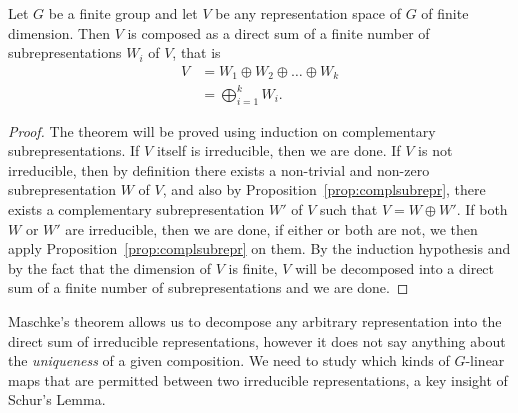 \begin{theorem}\label{thm:maschkes}
	Let $G$ be a finite group and let $V$ be any representation space of $G$ of finite dimension. Then $V$ is composed as a direct sum of a finite number of subrepresentations $W_i$ of $V$, that is
	\begin{align*}
		V &= W_1 \oplus W_2 \oplus \dots \oplus W_k \\
		&= \bigoplus_{i=1}^k W_i.
	\end{align*}
\end{theorem}
\begin{proof}
	The theorem will be proved using induction on complementary subrepresentations. If $V$ itself is irreducible, then we are done. If $V$ is not irreducible, then by definition there exists a non-trivial and non-zero subrepresentation $W$ of $V$, and also by Proposition~\ref{prop:complsubrepr}, there exists a complementary subrepresentation $W'$ of $V$ such that $V = W \oplus W'$. If both $W$ or $W'$ are irreducible, then we are done, if either or both are not, we then apply Proposition~\ref{prop:complsubrepr} on them. By the induction hypothesis and by the fact that the dimension of $V$ is finite, $V$ will be decomposed into a direct sum of a finite number of subrepresentations and we are done.
\end{proof}


Maschke's theorem allows us to decompose any arbitrary representation into the direct sum of irreducible representations, however it does not say anything about the \textit{uniqueness} of a given composition. We need to study which kinds of $G$-linear maps that are permitted between two irreducible representations, a key insight of Schur's Lemma.

